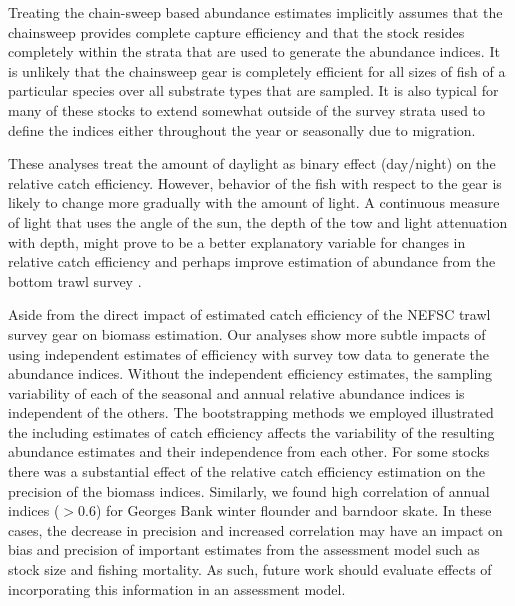 \documentclass[
  12pt,
]{article}
\begin{document}
Treating the chain-sweep based abundance estimates implicitly assumes
that the chainsweep provides complete capture efficiency and that the
stock resides completely within the strata that are used to generate the
abundance indices. It is unlikely that the chainsweep gear is completely
efficient for all sizes of fish of a particular species over all
substrate types that are sampled. It is also typical for many of these
stocks to extend somewhat outside of the survey strata used to define
the indices either throughout the year or seasonally due to migration.

These analyses treat the amount of daylight as binary effect (day/night)
on the relative catch efficiency. However, behavior of the fish with
respect to the gear is likely to change more gradually with the amount
of light. A continuous measure of light that uses the angle of the sun,
the depth of the tow and light attenuation with depth, might prove to be
a better explanatory variable for changes in relative catch efficiency
and perhaps improve estimation of abundance from the bottom trawl survey
\citep{jacobsonetal15,kaingeetal17}.

Aside from the direct impact of estimated catch efficiency of the NEFSC
trawl survey gear on biomass estimation. Our analyses show more subtle
impacts of using independent estimates of efficiency with survey tow
data to generate the abundance indices. Without the independent
efficiency estimates, the sampling variability of each of the seasonal
and annual relative abundance indices is independent of the others. The
bootstrapping methods we employed illustrated the including estimates of
catch efficiency affects the variability of the resulting abundance
estimates and their independence from each other. For some stocks there
was a substantial effect of the relative catch efficiency estimation on
the precision of the biomass indices. Similarly, we found high
correlation of annual indices (\(> 0.6\)) for Georges Bank winter
flounder and barndoor skate. In these cases, the decrease in precision
and increased correlation may have an impact on bias and precision of
important estimates from the assessment model such as stock size and
fishing mortality. As such, future work should evaluate effects of
incorporating this information in an assessment model.
\end{document}
